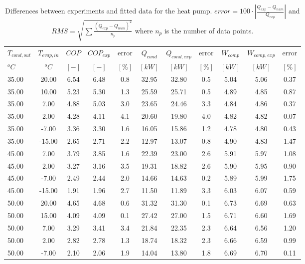 \documentclass[english]{SPFShortReport}
\begin{document}
\begin{table}[!ht]
\begin{small}
\caption{Differences between experiments and fitted data for the heat pump.          $error=100 \cdot |\frac{Q_{exp}-Q_{num}}{Q_{exp}}|$ and $RMS = \sqrt { \sum{\frac{(Q_{exp}-Q_{num})^2}{n_p}} }$ where $n_p$ is the number of data points.}
\begin{center}
\resizebox{12cm}{!} 
{
\begin{tabular}{l | c c c c c c c c c c } 
\hline
\hline
$T_{cond,out}$ &$T_{evap,in}$ &$COP$ &$COP_{exp}$ &error &$Q_{cond}$ &$Q_{cond,exp}$ &error &$W_{comp}$ &$W_{comp,exp}$ &error \\ 
$^oC$ &$^oC$ &$[-]$ &$[-]$ &$[\%]$ &$[kW]$ &$[kW]$ &$[\%]$ &$[kW]$ &$[kW]$ &$[\%]$\\ 
\hline
35.00  & 20.00 & 6.54 & 6.48 & 0.8 & 32.95 & 32.80 & 0.5 & 5.04 & 5.06 & 0.37\\ 
35.00  & 10.00 & 5.23 & 5.30 & 1.3 & 25.59 & 25.71 & 0.5 & 4.89 & 4.85 & 0.87\\ 
35.00  & 7.00 & 4.88 & 5.03 & 3.0 & 23.65 & 24.46 & 3.3 & 4.84 & 4.86 & 0.37\\ 
35.00  & 2.00 & 4.28 & 4.11 & 4.1 & 20.60 & 19.80 & 4.0 & 4.82 & 4.82 & 0.07\\ 
35.00  & -7.00 & 3.36 & 3.30 & 1.6 & 16.05 & 15.86 & 1.2 & 4.78 & 4.80 & 0.43\\ 
35.00  & -15.00 & 2.65 & 2.71 & 2.2 & 12.97 & 13.07 & 0.8 & 4.90 & 4.83 & 1.47\\ 
45.00  & 7.00 & 3.79 & 3.85 & 1.6 & 22.39 & 23.00 & 2.6 & 5.91 & 5.97 & 1.08\\ 
45.00  & 2.00 & 3.27 & 3.16 & 3.5 & 19.31 & 18.82 & 2.6 & 5.90 & 5.95 & 0.90\\ 
45.00  & -7.00 & 2.49 & 2.44 & 2.0 & 14.66 & 14.63 & 0.2 & 5.89 & 5.99 & 1.75\\ 
45.00  & -15.00 & 1.91 & 1.96 & 2.7 & 11.50 & 11.89 & 3.3 & 6.03 & 6.07 & 0.59\\ 
50.00  & 20.00 & 4.65 & 4.68 & 0.6 & 31.32 & 31.30 & 0.1 & 6.73 & 6.69 & 0.63\\ 
50.00  & 15.00 & 4.09 & 4.09 & 0.1 & 27.42 & 27.00 & 1.5 & 6.71 & 6.60 & 1.69\\ 
50.00  & 7.00 & 3.29 & 3.41 & 3.4 & 21.84 & 22.35 & 2.3 & 6.64 & 6.56 & 1.20\\ 
50.00  & 2.00 & 2.82 & 2.78 & 1.3 & 18.74 & 18.32 & 2.3 & 6.66 & 6.59 & 0.99\\ 
50.00  & -7.00 & 2.10 & 2.06 & 1.9 & 14.04 & 13.80 & 1.8 & 6.69 & 6.70 & 0.11\\ 

\end{tabular}}
\end{center}
\end{small}
\end{table}
\end{document}
